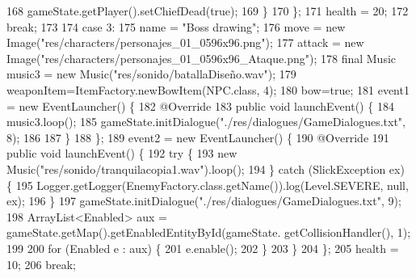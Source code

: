 \begin{DoxyCode}
168                             gameState.getPlayer().setChiefDead(\textcolor{keyword}{true});
169                         \}
170                     \};
171                     health = 20;
172                     \textcolor{keywordflow}{break};
173 
174                 \textcolor{keywordflow}{case} 3:
175                     name = \textcolor{stringliteral}{"Boss drawing"};
176                     move = \textcolor{keyword}{new} Image(\textcolor{stringliteral}{"res/characters/personajes\_01\_0596x96.png"});
177                     attack = \textcolor{keyword}{new} Image(\textcolor{stringliteral}{"res/characters/personajes\_01\_0596x96\_Ataque.png"});
178                     \textcolor{keyword}{final} Music music3 = \textcolor{keyword}{new} Music(\textcolor{stringliteral}{"res/sonido/batallaDiseño.wav"});
179                     weaponItem=ItemFactory.newBowItem(NPC.class, 4);
180                     bow=\textcolor{keyword}{true};
181                     event1 = \textcolor{keyword}{new} EventLauncher() \{
182                         @Override
183                         \textcolor{keyword}{public} \textcolor{keywordtype}{void} launchEvent() \{
184                             music3.loop();
185                             gameState.initDialogue(\textcolor{stringliteral}{"./res/dialogues/GameDialogues.txt"}, 8);
186 
187                         \}
188                     \};
189                     event2 = \textcolor{keyword}{new} EventLauncher() \{
190                         @Override
191                         \textcolor{keyword}{public} \textcolor{keywordtype}{void} launchEvent() \{
192                             \textcolor{keywordflow}{try} \{
193                                 \textcolor{keyword}{new} Music(\textcolor{stringliteral}{"res/sonido/tranquilacopia1.wav"}).loop();
194                             \} \textcolor{keywordflow}{catch} (SlickException ex) \{
195                                 Logger.getLogger(EnemyFactory.class.getName()).log(Level.SEVERE, null, ex);
196                             \}
197                             gameState.initDialogue(\textcolor{stringliteral}{"./res/dialogues/GameDialogues.txt"}, 9);
198                             ArrayList<Enabled> aux = gameState.getMap().getEnabledEntityById(gameState.
      getCollisionHandler(), 1);
199 
200                             \textcolor{keywordflow}{for} (Enabled e : aux) \{
201                                 e.enable();
202                             \}
203                         \}
204                     \};
205                     health = 10;
206                     \textcolor{keywordflow}{break};

\end{DoxyCode}
